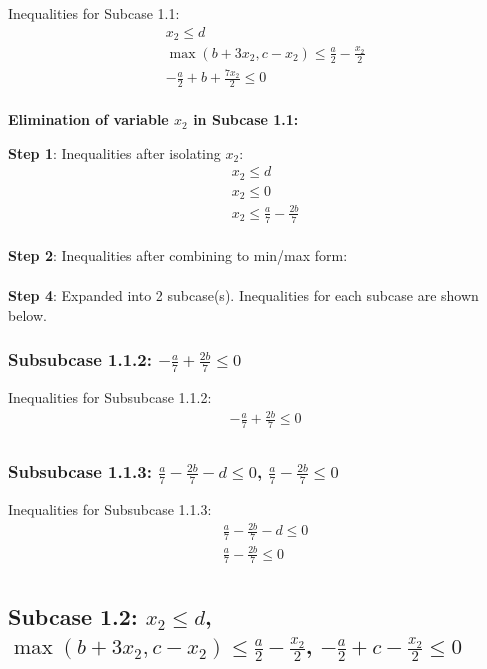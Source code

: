 \documentclass{article}
\begin{document}
Inequalities for Subcase 1.1:
\begin{align}
& x_{2} \leq d \\
& \max\left(b + 3 x_{2}, c - x_{2}\right) \leq \frac{a}{2} - \frac{x_{2}}{2} \\
& - \frac{a}{2} + b + \frac{7 x_{2}}{2} \leq 0 \\
\end{align}

\textbf{Elimination of variable $x_{2}$ in Subcase 1.1:}

\textbf{Step 1}: Inequalities after isolating $x_{2}$:
\begin{align}
& x_{2} \leq d \\
& x_{2} \leq 0 \\
& x_{2} \leq \frac{a}{7} - \frac{2 b}{7} \\
\end{align}

\textbf{Step 2}: Inequalities after combining to min/max form:
\begin{align}
\end{align}

\textbf{Step 4}: Expanded into 2 subcase(s). Inequalities for each subcase are shown below.

\subsubsection{Subsubcase 1.1.2: $- \frac{a}{7} + \frac{2 b}{7} \leq 0$}

Inequalities for Subsubcase 1.1.2:
\begin{align}
& - \frac{a}{7} + \frac{2 b}{7} \leq 0 \\
\end{align}

\subsubsection{Subsubcase 1.1.3: $\frac{a}{7} - \frac{2 b}{7} - d \leq 0$, $\frac{a}{7} - \frac{2 b}{7} \leq 0$}

Inequalities for Subsubcase 1.1.3:
\begin{align}
& \frac{a}{7} - \frac{2 b}{7} - d \leq 0 \\
& \frac{a}{7} - \frac{2 b}{7} \leq 0 \\
\end{align}

\subsection{Subcase 1.2: $x_{2} \leq d$, $\max\left(b + 3 x_{2}, c - x_{2}\right) \leq \frac{a}{2} - \frac{x_{2}}{2}$, $- \frac{a}{2} + c - \frac{x_{2}}{2} \leq 0$}
\end{document}
